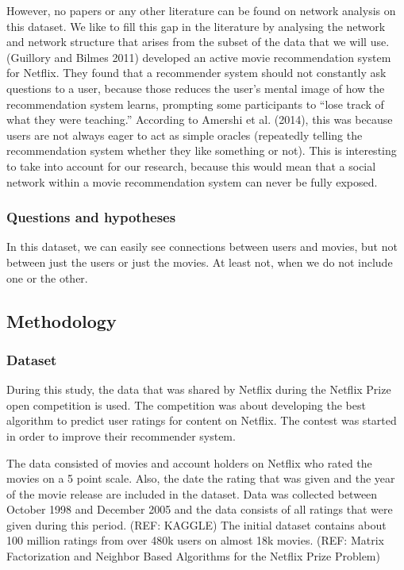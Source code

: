 \documentclass[
  man]{apa6}
\begin{document}
However, no papers or any other literature can be found on network
analysis on this dataset. We like to fill this gap in the literature by
analysing the network and network structure that arises from the subset
of the data that we will use. (Guillory and Bilmes 2011) developed an
active movie recommendation system for Netflix. They found that a
recommender system should not constantly ask questions to a user,
because those reduces the user's mental image of how the recommendation
system learns, prompting some participants to ``lose track of what they
were teaching.'' According to Amershi et al. (2014), this was because
users are not always eager to act as simple oracles (repeatedly telling
the recommendation system whether they like something or not). This is
interesting to take into account for our research, because this would
mean that a social network within a movie recommendation system can
never be fully exposed.

\hypertarget{questions-and-hypotheses}{%
\subsubsection{Questions and
hypotheses}\label{questions-and-hypotheses}}

In this dataset, we can easily see connections between users and movies,
but not between just the users or just the movies. At least not, when we
do not include one or the other.

\hypertarget{methodology}{%
\subsection{Methodology}\label{methodology}}

\hypertarget{dataset}{%
\subsubsection{Dataset}\label{dataset}}

During this study, the data that was shared by Netflix during the
Netflix Prize open competition is used. The competition was about
developing the best algorithm to predict user ratings for content on
Netflix. The contest was started in order to improve their recommender
system.

The data consisted of movies and account holders on Netflix who rated
the movies on a 5 point scale. Also, the date the rating that was given
and the year of the movie release are included in the dataset. Data was
collected between October 1998 and December 2005 and the data consists
of all ratings that were given during this period. (REF: KAGGLE) The
initial dataset contains about 100 million ratings from over 480k users
on almost 18k movies. (REF: Matrix Factorization and Neighbor Based
Algorithms for the Netflix Prize Problem)
\end{document}
